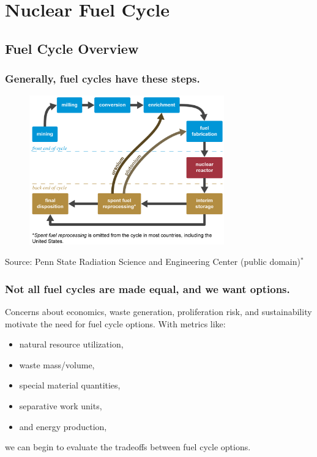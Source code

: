 \documentclass[9pt]{beamer}
\begin{document}
\section{Nuclear Fuel Cycle}
\subsection{Fuel Cycle Overview}
  \begin{frame}
      \frametitle{Generally, fuel cycles have these steps.}
      \begin{figure}[ht!]
      \centering
      \includegraphics[width=0.75\textwidth]{images/nuclear_fuel_cycle.png}
      \end{figure}
      Source: Penn State Radiation Science and Engineering Center (public domain)$^{*}$
  \end{frame}

  \begin{frame}
      \frametitle{Not all fuel cycles are made equal, and we want options.}
      Concerns about economics, waste generation, proliferation risk, and sustainability motivate the need for fuel cycle options. With metrics like:
        \begin{itemize}%
            \item natural resource utilization, %
            \item waste mass/volume,
            \item special material quantities,
            \item separative work units,
            \item and energy production,
        \end{itemize}
        we can begin to evaluate the tradeoffs between fuel cycle options.
  \end{frame}
\end{document}
